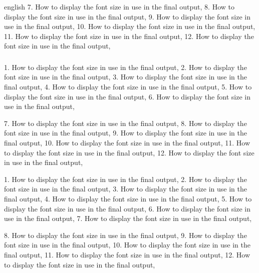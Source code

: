 \begin{otherlanguage*}{english}
7. How to display the font size in use in the final output,
8. How to display the font size in use in the final output,
9. How to display the font size in use in the final output,
10. How to display the font size in use in the final output,
11. How to display the font size in use in the final output,
12. How to display the font size in use in the final output,

\subsubsection{\UFSCshowFont}

1. How to display the font size in use in the final output,
2. How to display the font size in use in the final output,
3. How to display the font size in use in the final output,
4. How to display the font size in use in the final output,
5. How to display the font size in use in the final output,
6. How to display the font size in use in the final output,

7. How to display the font size in use in the final output,
8. How to display the font size in use in the final output,
9. How to display the font size in use in the final output,
10. How to display the font size in use in the final output,
11. How to display the font size in use in the final output,
12. How to display the font size in use in the final output,

\ABNTEXsubsubsubsection{\UFSCshowFont}

1. How to display the font size in use in the final output,
2. How to display the font size in use in the final output,
3. How to display the font size in use in the final output,
4. How to display the font size in use in the final output,
5. How to display the font size in use in the final output,
6. How to display the font size in use in the final output,
7. How to display the font size in use in the final output,

8. How to display the font size in use in the final output,
9. How to display the font size in use in the final output,
10. How to display the font size in use in the final output,
11. How to display the font size in use in the final output,
12. How to display the font size in use in the final output,

\end{otherlanguage*}
